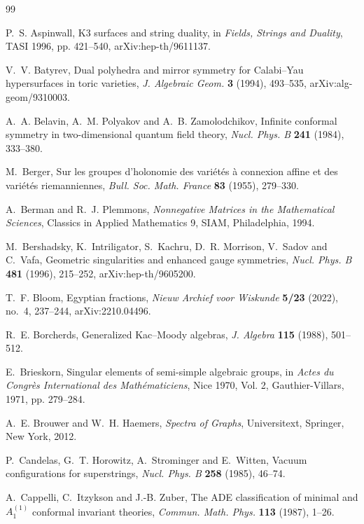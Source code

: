 \documentclass[11pt,a4paper]{article}
\theoremstyle{definition}
\theoremstyle{plain}
\begin{document}
\begin{thebibliography}{99}

P.~S. Aspinwall, K3 surfaces and string duality, in \emph{Fields, Strings and Duality}, TASI 1996, pp. 421--540, arXiv:hep-th/9611137.

V.~V. Batyrev, Dual polyhedra and mirror symmetry for Calabi--Yau hypersurfaces in toric varieties, \emph{J. Algebraic Geom.} \textbf{3} (1994), 493--535, arXiv:alg-geom/9310003.

A.~A. Belavin, A.~M. Polyakov and A.~B. Zamolodchikov, Infinite conformal symmetry in two-dimensional quantum field theory, \emph{Nucl. Phys. B} \textbf{241} (1984), 333--380.

M.~Berger, Sur les groupes d'holonomie des vari\'et\'es \`a connexion affine et des vari\'et\'es riemanniennes, \emph{Bull. Soc. Math. France} \textbf{83} (1955), 279--330.

A.~Berman and R.~J. Plemmons, \emph{Nonnegative Matrices in the Mathematical Sciences}, Classics in Applied Mathematics 9, SIAM, Philadelphia, 1994.

M.~Bershadsky, K.~Intriligator, S.~Kachru, D.~R. Morrison, V.~Sadov and C.~Vafa, Geometric singularities and enhanced gauge symmetries, \emph{Nucl. Phys. B} \textbf{481} (1996), 215--252, arXiv:hep-th/9605200.

T.~F. Bloom, Egyptian fractions, \emph{Nieuw Archief voor Wiskunde} \textbf{5/23} (2022), no.~4, 237--244, arXiv:2210.04496.

R.~E. Borcherds, Generalized Kac--Moody algebras, \emph{J. Algebra} \textbf{115} (1988), 501--512.

E.~Brieskorn, Singular elements of semi-simple algebraic groups, in \emph{Actes du Congr\`es International des Math\'ematiciens}, Nice 1970, Vol. 2, Gauthier-Villars, 1971, pp. 279--284.

A.~E. Brouwer and W.~H. Haemers, \emph{Spectra of Graphs}, Universitext, Springer, New York, 2012.

P.~Candelas, G.~T. Horowitz, A.~Strominger and E.~Witten, Vacuum configurations for superstrings, \emph{Nucl. Phys. B} \textbf{258} (1985), 46--74.

A.~Cappelli, C.~Itzykson and J.-B. Zuber, The ADE classification of minimal and $A_1^{(1)}$ conformal invariant theories, \emph{Commun. Math. Phys.} \textbf{113} (1987), 1--26.


\end{thebibliography}
\end{document}
